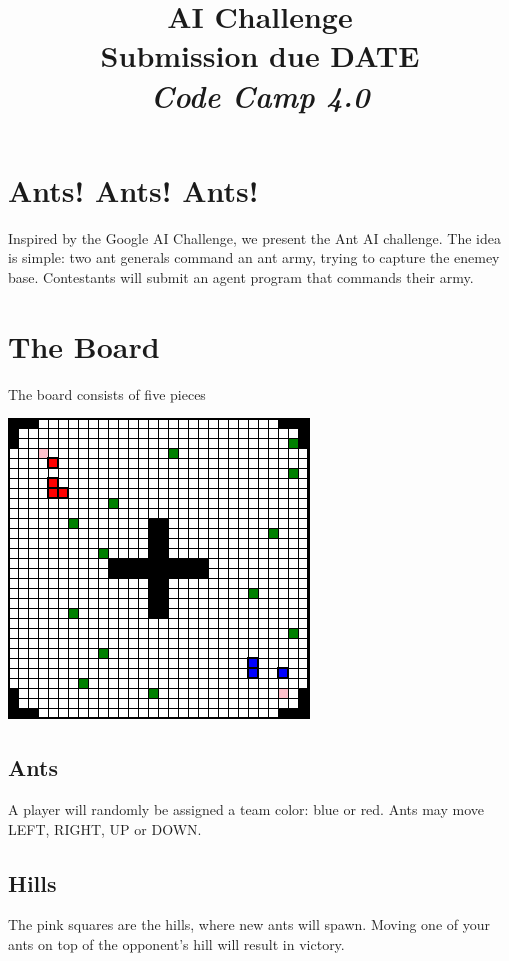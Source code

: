 \documentclass{article}
\title{
\vspace{2in}
\textmd{\textbf{AI Challenge}}\\
\normalsize\vspace{0.1in}\small{Submission due DATE}\\
\vspace{0.1in}\large{\textit{Code Camp 4.0}}
\vspace{3in}
}
\date{}
\begin{document}
\maketitle
\newpage

\section{Ants! Ants! Ants!}


Inspired by the Google AI Challenge, we present the Ant AI challenge. The idea is simple: two ant generals command an ant army, trying to capture the enemey base. Contestants will submit an agent program that commands their army.

\section{The Board}

The board consists of five pieces

	\begin{center} 
		\includegraphics[scale=0.5]{exampleBoard.png}
	\end{center}

\subsection{Ants}
A player will randomly be assigned a team color: blue or red. Ants may move LEFT, RIGHT, UP or DOWN.

\subsection{Hills}
The pink squares are the hills, where new ants will spawn. Moving one of your ants on top of the opponent's hill will result in victory.
\end{document}
